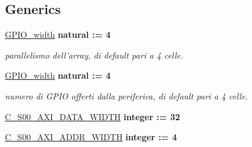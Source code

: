 \subsection*{Generics}
 \begin{DoxyCompactItemize}
\item 
\hypertarget{group__my_g_p_i_o_ga0b52ca75e9a6093b2b60d5e851803069}{\hyperlink{group__my_g_p_i_o_ga0b52ca75e9a6093b2b60d5e851803069}{G\+P\+I\+O\+\_\+width} {\bfseries {\bfseries \textcolor{vhdlchar}{natural}\textcolor{vhdlchar}{ }\textcolor{vhdlchar}{ }\textcolor{vhdlchar}{\+:}\textcolor{vhdlchar}{=}\textcolor{vhdlchar}{ }\textcolor{vhdlchar}{ } \textcolor{vhdldigit}{4} \textcolor{vhdlchar}{ }}}}\label{group__my_g_p_i_o_ga0b52ca75e9a6093b2b60d5e851803069}

\begin{DoxyCompactList}\small\item\em parallelismo dell'array, di default pari a 4 celle. \end{DoxyCompactList}\item 
\hypertarget{group__my_g_p_i_o_ga0b52ca75e9a6093b2b60d5e851803069}{\hyperlink{group__my_g_p_i_o_ga0b52ca75e9a6093b2b60d5e851803069}{G\+P\+I\+O\+\_\+width} {\bfseries {\bfseries \textcolor{vhdlchar}{natural}\textcolor{vhdlchar}{ }\textcolor{vhdlchar}{ }\textcolor{vhdlchar}{\+:}\textcolor{vhdlchar}{=}\textcolor{vhdlchar}{ }\textcolor{vhdlchar}{ } \textcolor{vhdldigit}{4} \textcolor{vhdlchar}{ }}}}\label{group__my_g_p_i_o_ga0b52ca75e9a6093b2b60d5e851803069}

\begin{DoxyCompactList}\small\item\em numero di G\+P\+I\+O offerti dalla periferica, di default pari a 4 celle. \end{DoxyCompactList}\item 
\hypertarget{group__my_g_p_i_o_gafce7943994a4ddfa81f224225976a4c7}{\hyperlink{group__my_g_p_i_o_gafce7943994a4ddfa81f224225976a4c7}{C\+\_\+\+S00\+\_\+\+A\+X\+I\+\_\+\+D\+A\+T\+A\+\_\+\+W\+I\+D\+T\+H} {\bfseries {\bfseries \textcolor{vhdlchar}{integer}\textcolor{vhdlchar}{ }\textcolor{vhdlchar}{ }\textcolor{vhdlchar}{\+:}\textcolor{vhdlchar}{=}\textcolor{vhdlchar}{ }\textcolor{vhdlchar}{ } \textcolor{vhdldigit}{32} \textcolor{vhdlchar}{ }}}}\label{group__my_g_p_i_o_gafce7943994a4ddfa81f224225976a4c7}

\item 
\hypertarget{group__my_g_p_i_o_gaa5e5b8ec4a71e3b99ec33afb74cc4970}{\hyperlink{group__my_g_p_i_o_gaa5e5b8ec4a71e3b99ec33afb74cc4970}{C\+\_\+\+S00\+\_\+\+A\+X\+I\+\_\+\+A\+D\+D\+R\+\_\+\+W\+I\+D\+T\+H} {\bfseries {\bfseries \textcolor{vhdlchar}{integer}\textcolor{vhdlchar}{ }\textcolor{vhdlchar}{ }\textcolor{vhdlchar}{\+:}\textcolor{vhdlchar}{=}\textcolor{vhdlchar}{ }\textcolor{vhdlchar}{ } \textcolor{vhdldigit}{4} \textcolor{vhdlchar}{ }}}}\label{group__my_g_p_i_o_gaa5e5b8ec4a71e3b99ec33afb74cc4970}


\end{DoxyCompactItemize}
